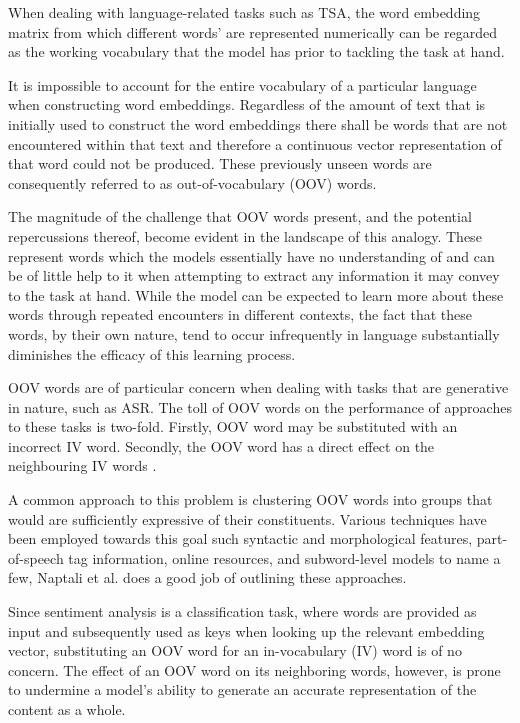 \documentclass[../../fyp.tex]{subfiles}
\begin{document}
When dealing with language-related tasks such as TSA, the word embedding matrix from which different words' are represented numerically can be regarded as the working vocabulary that the model has prior to tackling the task at hand.

It is impossible to account for the entire vocabulary of a particular language when constructing word embeddings. Regardless of the amount of text that is initially used to construct the word embeddings there shall be words that are not encountered within that text and therefore a continuous vector representation of that word could not be produced. These previously unseen words are consequently referred to as out-of-vocabulary (OOV) words.

The magnitude of the challenge that OOV words present, and the potential repercussions thereof, become evident in the landscape of this analogy. These represent words which the models essentially have no understanding of and can be of little help to it when attempting to extract any information it may convey to the task at hand. While the model can be expected to learn more about these words through repeated encounters in different contexts, the fact that these words, by their own nature, tend to occur infrequently in language substantially diminishes the efficacy of this learning process.

OOV words are of particular concern when dealing with tasks that are generative in nature, such as ASR. The toll of OOV words on the performance of approaches to these tasks is two-fold. Firstly, OOV word may be substituted with an incorrect IV word. Secondly, the OOV word has a direct effect on the neighbouring IV words \cite{naptali2012}.

A common approach to this problem is clustering OOV words into groups that would are sufficiently expressive of their constituents. Various techniques have been employed towards this goal such syntactic and morphological features, part-of-speech tag information, online resources, and subword-level models to name a few, Naptali et al. \cite{naptali2012} does a good job of outlining these approaches.

Since sentiment analysis is a classification task, where words are provided as input and subsequently used as keys when looking up the relevant embedding vector, substituting an OOV word for an in-vocabulary (IV) word is of no concern. The effect of an OOV word on its neighboring words, however, is prone to undermine a model's ability to generate an accurate representation of the content as a whole.
\end{document}
